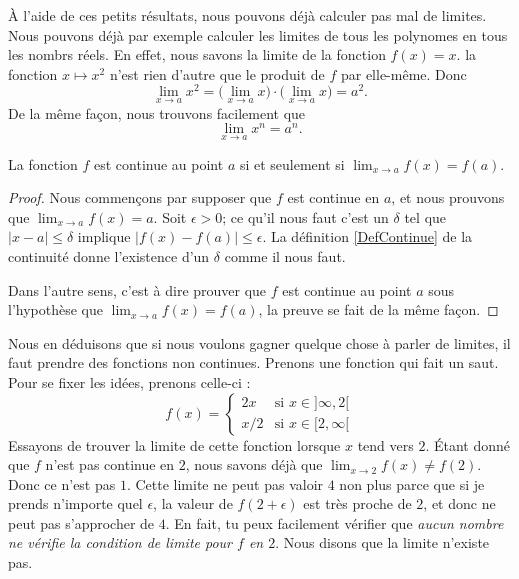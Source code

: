 À l'aide de ces petits résultats, nous pouvons déjà calculer pas mal de limites. Nous pouvons déjà par exemple calculer les limites de tous les polynomes en tous les nombrs réels. En effet, nous savons la limite de la fonction $f(x)=x$. la fonction $x\mapsto x^2$ n'est rien d'autre que le produit de $f$ par elle-même. Donc
\[ 
  \lim_{x\to a}x^2=\big( \lim_{x\to a}x\big)\cdot\big( \lim_{x\to a}x \big)=a^2.
\]
De la même façon, nous trouvons facilement que 
\begin{equation}
 \lim_{x\to a}x^n=a^n.
\end{equation}

\begin{theorem}           \label{ThoLimCont}
La fonction $f$ est continue au point $a$ si et seulement si $\lim_{x\to a}f(x)=f(a)$.
\end{theorem}

\begin{proof}
Nous commençons par supposer que $f$ est continue en $a$, et nous prouvons que $\lim_{x\to a}f(x)=a$. Soit $\epsilon>0$; ce qu'il nous faut c'est un $\delta$ tel que $| x-a |\leq\delta$ implique $| f(x)-f(a) |\leq\epsilon$. La définition \ref{DefContinue} de la continuité donne l'existence d'un $\delta$ comme il nous faut.

Dans l'autre sens, c'est à dire prouver que $f$ est continue au point $a$ sous l'hypothèse que $\lim_{x\to a}f(x)=f(a)$, la preuve se fait de la même façon.
\end{proof}

Nous en déduisons que si nous voulons gagner quelque chose à parler de limites, il faut prendre des fonctions non continues. Prenons une fonction qui fait un saut. Pour se fixer les idées, prenons celle-ci :
\begin{equation}    \label{EqnCtOEL}
f(x)=
\begin{cases}
2x&\text{si $x\in]\infty,2[$}\\
x/2&\text{si $x\in[2,\infty[$}
\end{cases}
\end{equation}  
Essayons de trouver la limite de cette fonction lorsque $x$ tend vers $2$. Étant donné que $f$ n'est pas continue en $2$, nous savons déjà que $\lim_{x\to 2}f(x)\neq f(2)$. Donc ce n'est pas $1$. Cette limite ne peut pas valoir $4$ non plus parce que si je prends n'importe quel $\epsilon$, la valeur de $f(2+\epsilon)$ est très proche de $2$, et donc ne peut pas s'approcher de $4$. En fait, tu peux facilement vérifier que \emph{aucun nombre ne vérifie la condition de limite pour $f$ en $2$}. Nous disons que la limite n'existe pas.

